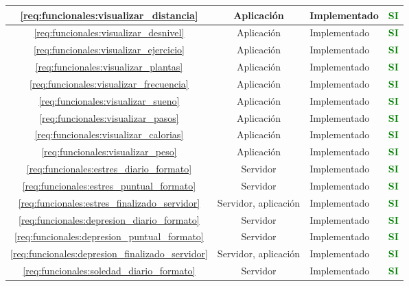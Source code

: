 \begin{xltabular}{\textwidth}{|c|c|X|c|}
        \hline
        \ref{req:funcionales:visualizar_distancia} & Aplicación & Implementado & \textcolor{green}{\textbf{SI}} \\
        \hline
        \ref{req:funcionales:visualizar_desnivel} & Aplicación & Implementado & \textcolor{green}{\textbf{SI}} \\
        \hline
        \ref{req:funcionales:visualizar_ejercicio} & Aplicación & Implementado & \textcolor{green}{\textbf{SI}} \\
        \hline
        \ref{req:funcionales:visualizar_plantas} & Aplicación & Implementado & \textcolor{green}{\textbf{SI}} \\
        \hline
        \ref{req:funcionales:visualizar_frecuencia} & Aplicación & Implementado & \textcolor{green}{\textbf{SI}} \\
        \hline
        \ref{req:funcionales:visualizar_sueno} & Aplicación & Implementado & \textcolor{green}{\textbf{SI}} \\
        \hline
        \ref{req:funcionales:visualizar_pasos} & Aplicación & Implementado & \textcolor{green}{\textbf{SI}} \\
        \hline
        \ref{req:funcionales:visualizar_calorias} & Aplicación & Implementado & \textcolor{green}{\textbf{SI}} \\
        \hline
        \ref{req:funcionales:visualizar_peso} & Aplicación & Implementado & \textcolor{green}{\textbf{SI}} \\
        \hline
        \ref{req:funcionales:estres_diario_formato} & Servidor & Implementado & \textcolor{green}{\textbf{SI}} \\
        \hline
        \ref{req:funcionales:estres_puntual_formato} & Servidor & Implementado & \textcolor{green}{\textbf{SI}} \\
        \hline
        \ref{req:funcionales:estres_finalizado_servidor} & Servidor, aplicación & Implementado & \textcolor{green}{\textbf{SI}} \\
        \hline
        \ref{req:funcionales:depresion_diario_formato} & Servidor & Implementado & \textcolor{green}{\textbf{SI}} \\
        \hline
        \ref{req:funcionales:depresion_puntual_formato} & Servidor & Implementado & \textcolor{green}{\textbf{SI}} \\
        \hline
        \ref{req:funcionales:depresion_finalizado_servidor} & Servidor, aplicación & Implementado & \textcolor{green}{\textbf{SI}} \\
        \hline
        \ref{req:funcionales:soledad_diario_formato} & Servidor & Implementado & \textcolor{green}{\textbf{SI}} \\

\end{xltabular}
